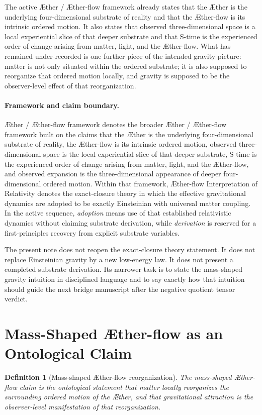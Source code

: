 \documentclass[11pt]{article}
\newcommand{\Aether}{\AE{}ther}
\newcommand{\Aflow}{\AE{}ther-flow}
\newcommand{\TheoryName}{\Aflow{} Interpretation of Relativity}
\newcommand{\TheoryProgram}{\Aether{} / \Aflow{} framework}
\newtheorem{definition}{Definition}
\begin{document}
The active \TheoryProgram{} already states that the \Aether{} is the underlying four-dimensional substrate of reality and that the \Aflow{} is its intrinsic ordered motion. It also states that observed three-dimensional space is a local experiential slice of that deeper substrate and that S-time is the experienced order of change arising from matter, light, and the \Aflow{}. What has remained under-recorded is one further piece of the intended gravity picture: matter is not only situated within the ordered substrate; it is also supposed to reorganize that ordered motion locally, and gravity is supposed to be the observer-level effect of that reorganization.

\paragraph{Framework and claim boundary.}
\TheoryProgram{} denotes the broader \Aether{} / \Aflow{} framework built on the claims that the \Aether{} is the underlying four-dimensional substrate of reality, the \Aflow{} is its intrinsic ordered motion, observed three-dimensional space is the local experiential slice of that deeper substrate, S-time is the experienced order of change arising from matter, light, and the \Aflow{}, and observed expansion is the three-dimensional appearance of deeper four-dimensional ordered motion. Within that framework, \TheoryName{} denotes the exact-closure theory in which the effective gravitational dynamics are adopted to be exactly Einsteinian with universal matter coupling. In the active sequence, \emph{adoption} means use of that established relativistic dynamics without claiming substrate derivation, while \emph{derivation} is reserved for a first-principles recovery from explicit substrate variables.

The present note does not reopen the exact-closure theory statement. It does not replace Einsteinian gravity by a new low-energy law. It does not present a completed substrate derivation. Its narrower task is to state the mass-shaped gravity intuition in disciplined language and to say exactly how that intuition should guide the next bridge manuscript after the negative quotient tensor verdict.

\section{Mass-Shaped \Aflow{} as an Ontological Claim}

\begin{definition}[Mass-shaped \Aflow{} reorganization]
The \emph{mass-shaped \Aflow{} claim} is the ontological statement that matter locally reorganizes the surrounding ordered motion of the \Aether{}, and that gravitational attraction is the observer-level manifestation of that reorganization.
\end{definition}
\end{document}

